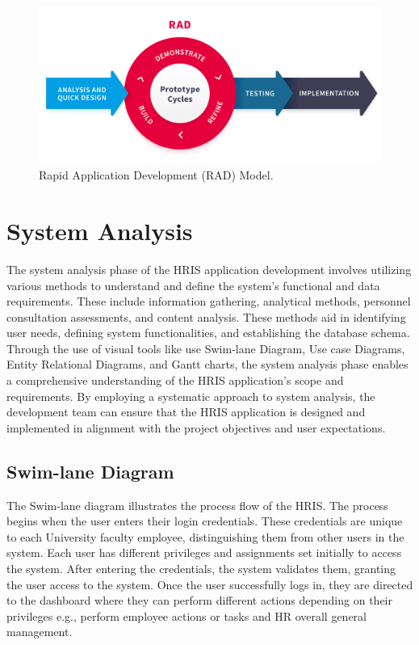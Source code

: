 \begin{figure}[H]
    \centering
    \includegraphics[width=1\linewidth]{figures/fig-2.png}
    \caption{Rapid Application Development (RAD) Model.}
    \label{fig:enter-label}
\end{figure}
    
\section{System Analysis}
The system analysis phase of the HRIS application development involves utilizing various methods to understand and define the system's functional and data requirements. These include information gathering, analytical methods, personnel consultation assessments, and content analysis. These methods aid in identifying user needs, defining system functionalities, and establishing the database schema. Through the use of visual tools like use Swim-lane Diagram, Use case Diagrams, Entity Relational Diagrams, and Gantt charts, the system analysis phase enables a comprehensive understanding of the HRIS application's scope and requirements. By employing a systematic approach to system analysis, the development team can ensure that the HRIS application is designed and implemented in alignment with the project objectives and user expectations.

    \subsection{Swim-lane Diagram}
    The Swim-lane diagram illustrates the process flow of the HRIS. The process begins when the user enters their login credentials. These credentials are unique to each University faculty employee, distinguishing them from other users in the system. Each user has different privileges and assignments set initially to access the system. After entering the credentials, the system validates them, granting the user access to the system. Once the user successfully logs in, they are directed to the dashboard where they can perform different actions depending on their privileges e.g., perform employee actions or tasks and HR overall general management.
    \\

